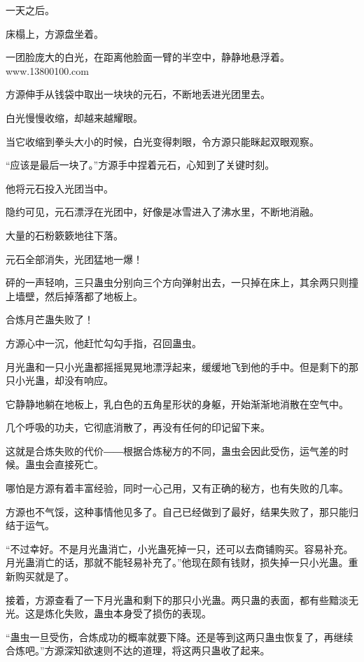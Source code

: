 
\begin{this_body}

一天之后。

床榻上，方源盘坐着。

一团脸庞大的白光，在距离他脸面一臂的半空中，静静地悬浮着。www.13800100.com

方源伸手从钱袋中取出一块块的元石，不断地丢进光团里去。

白光慢慢收缩，却越来越耀眼。

当它收缩到拳头大小的时候，白光变得刺眼，令方源只能眯起双眼观察。

“应该是最后一块了。”方源手中捏着元石，心知到了关键时刻。

他将元石投入光团当中。

隐约可见，元石漂浮在光团中，好像是冰雪进入了沸水里，不断地消融。

大量的石粉簌簌地往下落。

元石全部消失，光团猛地一爆！

砰的一声轻响，三只蛊虫分别向三个方向弹射出去，一只掉在床上，其余两只则撞上墙壁，然后掉落都了地板上。

合炼月芒蛊失败了！

方源心中一沉，他赶忙勾勾手指，召回蛊虫。

月光蛊和一只小光蛊都摇摇晃晃地漂浮起来，缓缓地飞到他的手中。但是剩下的那只小光蛊，却没有响应。

它静静地躺在地板上，乳白色的五角星形状的身躯，开始渐渐地消散在空气中。

几个呼吸的功夫，它彻底消散了，再没有任何的印记留下来。

这就是合炼失败的代价――根据合炼秘方的不同，蛊虫会因此受伤，运气差的时候。蛊虫会直接死亡。

哪怕是方源有着丰富经验，同时一心己用，又有正确的秘方，也有失败的几率。

方源也不气馁，这种事情他见多了。自己已经做到了最好，结果失败了，那只能归结于运气。

“不过幸好。不是月光蛊消亡，小光蛊死掉一只，还可以去商铺购买。容易补充。月光蛊消亡的话，那就不能轻易补充了。”他现在颇有钱财，损失掉一只小光蛊。重新购买就是了。

接着，方源查看了一下月光蛊和剩下的那只小光蛊。两只蛊的表面，都有些黯淡无光。这是炼化失败，蛊虫本身受了损伤的表现。

“蛊虫一旦受伤，合炼成功的概率就要下降。还是等到这两只蛊虫恢复了，再继续合炼吧。”方源深知欲速则不达的道理，将这两只蛊收了起来。


\end{this_body}
